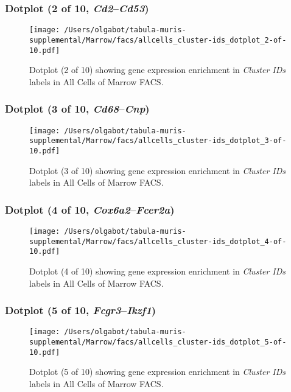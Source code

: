 \clearpage

\subsubsection{Dotplot (2 of 10, \emph{Cd2}--\emph{Cd53})}
\begin{figure}[h]
\centering
\texttt{[image: /Users/olgabot/tabula-muris-supplemental/Marrow/facs/allcells\_cluster-ids\_dotplot\_2-of-10.pdf]}

\caption{ Dotplot (2 of 10)  showing gene expression enrichment in \emph{Cluster IDs} labels in All Cells of Marrow FACS. }
\end{figure}


\clearpage

\subsubsection{Dotplot (3 of 10, \emph{Cd68}--\emph{Cnp})}
\begin{figure}[h]
\centering
\texttt{[image: /Users/olgabot/tabula-muris-supplemental/Marrow/facs/allcells\_cluster-ids\_dotplot\_3-of-10.pdf]}

\caption{ Dotplot (3 of 10)  showing gene expression enrichment in \emph{Cluster IDs} labels in All Cells of Marrow FACS. }
\end{figure}


\clearpage

\subsubsection{Dotplot (4 of 10, \emph{Cox6a2}--\emph{Fcer2a})}
\begin{figure}[h]
\centering
\texttt{[image: /Users/olgabot/tabula-muris-supplemental/Marrow/facs/allcells\_cluster-ids\_dotplot\_4-of-10.pdf]}

\caption{ Dotplot (4 of 10)  showing gene expression enrichment in \emph{Cluster IDs} labels in All Cells of Marrow FACS. }
\end{figure}


\clearpage

\subsubsection{Dotplot (5 of 10, \emph{Fcgr3}--\emph{Ikzf1})}
\begin{figure}[h]
\centering
\texttt{[image: /Users/olgabot/tabula-muris-supplemental/Marrow/facs/allcells\_cluster-ids\_dotplot\_5-of-10.pdf]}

\caption{ Dotplot (5 of 10)  showing gene expression enrichment in \emph{Cluster IDs} labels in All Cells of Marrow FACS. }
\end{figure}


